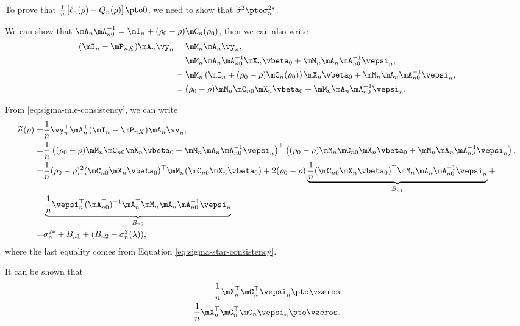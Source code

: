 \documentclass[english,12pt]{book}\usepackage[]{graphicx}\usepackage[]{xcolor}
\begin{document}
\begin{subappendices}
To prove that $\frac{1}{n}\left[\ell_n(\rho) - Q_n(\rho)\right]\pto 0$, we need to show that $\widetilde{\sigma}^{2}\pto \sigma^{2*}_n$. 

We can show that $\mA_n\mA_{n0}^{-1} = \mI_n + (\rho_0 - \rho)\mC_n(\rho_0)$, then we can also write
\begin{equation*}
\begin{aligned}
  (\mI_n - \mP_{nX})\mA_n\vy_n & = \mM_n\mA_n\vy_n, \\
                               & = \mM_n\mA_n\mA_{n0}^{-1}\mX_n\vbeta_0 + \mM_n\mA_n\mA_{n0}^{-1}\vepsi_n, \\
& = \mM_n\left(\mI_n + (\rho_0 - \rho)\mC_n(\rho_0)\right)\mX_n\vbeta_0 + \mM_n\mA_n\mA_{n0}^{-1}\vepsi_n,       \\
& = (\rho_0 - \rho)\mM_n\mC_{n0}\mX_n\vbeta_0 + \mM_n\mA_n\mA_{n0}^{-1}\vepsi_n, 
\end{aligned}
\end{equation*}

From \eqref{eq:sigma-mle-consistency}, we can write
\begin{equation*}
\begin{aligned}
\widetilde{\sigma}(\rho)  = & \frac{1}{n}\vy_n^\top\mA_n^\top(\mI_n - \mP_{nX})\mA_n\vy_n, \\
 = & \frac{1}{n}\left((\rho_0 - \rho)\mM_n\mC_{n0}\mX_n\vbeta_0 + \mM_n\mA_n\mA_{n0}^{-1}\vepsi_n \right)^\top \left((\rho_0 - \rho)\mM_n\mC_{n0}\mX_n\vbeta_0 + \mM_n\mA_n\mA_{n0}^{-1}\vepsi_n \right), \\
 = & \frac{1}{n}(\rho_0 - \rho)^2(\mC_{n0}\mX_n\vbeta_0)^\top\mM_n(\mC_{n0}\mX_n\vbeta_0) + 2(\rho_0 - \rho)\underbrace{\frac{1}{n}(\mC_{n0}\mX_n\vbeta_0)^\top\mM_n\mA_n\mA_{n0}^{-1}\vepsi_n}_{B_{n1}} +  \\
& \underbrace{\frac{1}{n}\vepsi_n^\top(\mA_{n0}^\top)^{-1}\mA_n^\top\mM_n\mA_n\mA_{n0}^{-1}\vepsi_n}_{B_{n2}} \\
= & \sigma^{2*}_n + B_{n1} + (B_{n2} - \sigma^2_n(\lambda)), 
\end{aligned}
\end{equation*}
%
where the last equality comes from Equation \eqref{eq:sigma-star-consistency}. 

It can be shown that 
\begin{equation}
    \begin{aligned}
      \frac{1}{n}\mX_n^\top\mC_n^\top\vepsi_n \pto \vzeros \\
      \frac{1}{n}\mX_n^\top\mC_n^\top\mC_n\vepsi_n \pto \vzeros. 
    \end{aligned}
\end{equation}


\end{subappendices}
\end{document}
